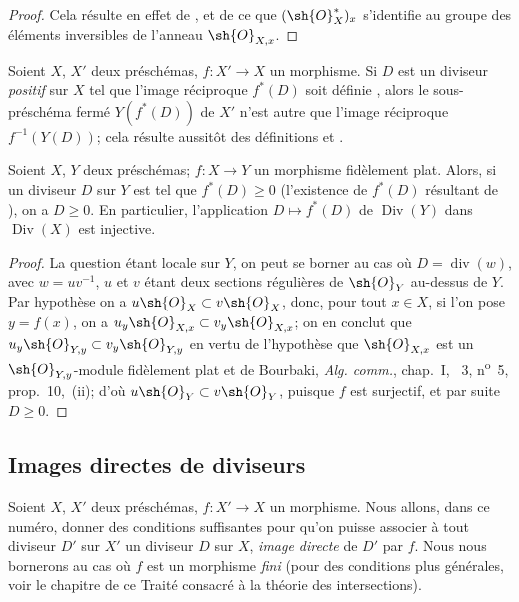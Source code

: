 \begin{proof}
Cela résulte en effet de ,  et de ce que $(\sh{O}_X^*)_x$ s'identifie au groupe des éléments inversibles de l'anneau $\sh{O}_{X,x}$.
\end{proof}

\begin{env}[21.4.7]
\label{IV.21.4.7}
Soient $X$, $X'$ deux préschémas, $f:X'\to X$ un morphisme.
Si $D$ est un diviseur \emph{positif} sur $X$ tel que l'image réciproque $f^*(D)$ soit définie , alors le sous-préschéma fermé $Y(f^*(D))$ de $X'$ n'est autre que l'image réciproque $f^{-1}(Y(D))$;
cela résulte aussitôt des définitions  et .
\end{env}

\begin{proposition}[21.4.8]
Soient $X$, $Y$ deux préschémas;
$f:X\to Y$ un morphisme fidèlement plat.
Alors, si un diviseur $D$ sur $Y$ est tel que $f^*(D)\geq0$ (l'existence de $f^*(D)$ résultant de ), on a $D\geq0$.
En particulier, l'application $D\mapsto f^*(D)$ de $\operatorname{Div}(Y)$ dans $\operatorname{Div}(X)$ est injective.
\end{proposition}

\begin{proof}
La question étant locale sur $Y$, on peut se borner au cas où $D=\operatorname{div}(w)$, avec $w=uv^{-1}$, $u$ et $v$ étant deux sections régulières de $\sh{O}_Y$ au-dessus de $Y$.
Par hypothèse on a $u\sh{O}_X\subset v\sh{O}_X$, donc, pour tout $x\in X$, si l'on pose $y=f(x)$, on a $u_y\sh{O}_{X,x}\subset v_y\sh{O}_{X,x}$;
on en conclut que $u_y\sh{O}_{Y,y}\subset v_y\sh{O}_{Y,y}$ en vertu de l'hypothèse que $\sh{O}_{X,x}$ est un $\sh{O}_{Y,y}$-module fidèlement plat et de Bourbaki, \emph{Alg. comm.}, chap.~I, \textsection~3, n\textsuperscript{o}~5, prop.~10,~(ii);
d'où $u\sh{O}_Y\subset v\sh{O}_Y$, puisque $f$ est surjectif, et par suite $D\geq0$.
\end{proof}

\subsection{Images directes de diviseurs}
\label{IV.21.5}

\begin{env}[21.5.1]
\label{IV.21.5.1}
Soient $X$, $X'$ deux préschémas, $f:X'\to X$ un morphisme.
Nous allons, dans ce numéro, donner des conditions suffisantes pour qu'on puisse associer à tout diviseur $D'$ sur $X'$ un diviseur $D$ sur $X$, \emph{image directe} de $D'$ par $f$.
Nous nous bornerons au cas où $f$ est un morphisme \emph{fini} (pour des conditions plus générales, voir le chapitre de ce Traité consacré à la théorie des intersections).
\end{env}


